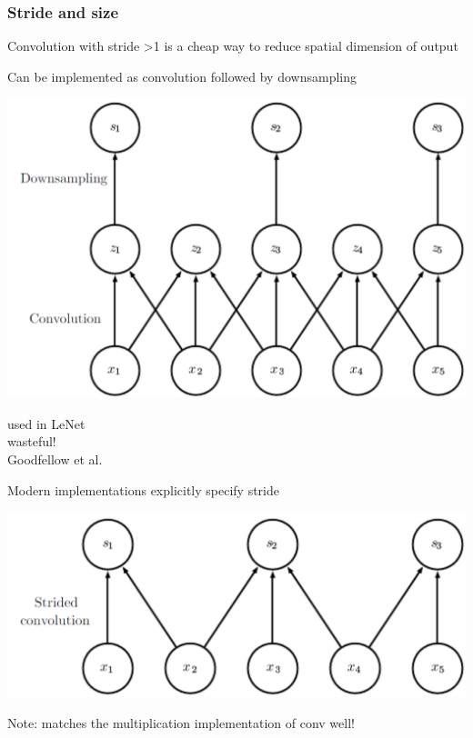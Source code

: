 \documentclass[xcolor=dvipsnames]{beamer}
\begin{document}
\begin{frame}
  \frametitle{Stride and size}
  \bi
\item Convolution with stride \textgreater 1 is a cheap way to reduce
  spatial dimension of output
\item Can be implemented as convolution followed by downsampling
  \begin{minipage}[c]{.4\linewidth}
    \includegraphics[width=.9\textwidth]{gcb-downconv}
  \end{minipage}%
  \begin{minipage}[c]{.5\linewidth}
    used in LeNet\\
    wasteful!\\
    Goodfellow et al.
  \end{minipage}

\item Modern implementations explicitly specify stride

    \includegraphics[width=.4\textwidth]{gcb-strideconv}\raisebox{1em}{[Goodfellow
et al]}
\item Note: matches the multiplication implementation of conv well!
\ei
\end{frame}
\end{document}
